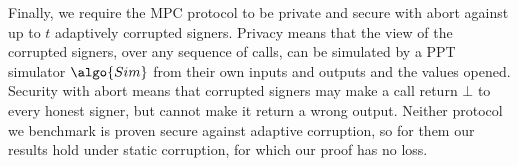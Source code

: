 Finally, we require the MPC protocol to be private and secure with
abort against up to $t$ adaptively corrupted signers. Privacy means that the
view of the corrupted signers, over any sequence of calls, can be simulated by a
PPT simulator $\algo{Sim}$ from their own inputs and outputs and the values
opened. Security with abort means that corrupted signers may make a call return
$\bot$ to every honest signer, but cannot make it return a wrong output. Neither
protocol we benchmark is proven secure against adaptive corruption, so for them
our results hold under static corruption, for which our proof has no loss.
